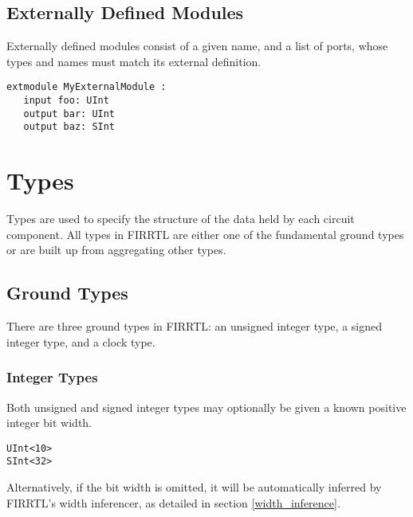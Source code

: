 \documentclass[12pt]{article}
\begin{document}
\subsection{Externally Defined Modules}
Externally defined modules consist of a given name, and a list of ports, whose types and names must match its external definition.

\begin{lstlisting}
extmodule MyExternalModule :
   input foo: UInt
   output bar: UInt
   output baz: SInt
\end{lstlisting}  




\section{Types}

Types are used to specify the structure of the data held by each circuit component. All types in FIRRTL are either one of the fundamental ground types or are built up from aggregating other types. 

\subsection{Ground Types}

There are three ground types in FIRRTL: an unsigned integer type, a signed integer type, and a clock type.

\subsubsection{Integer Types}

Both unsigned and signed integer types may optionally be given a known positive integer bit width.

\begin{lstlisting}
UInt<10>
SInt<32>
\end{lstlisting}  

Alternatively, if the bit width is omitted, it will be automatically inferred by FIRRTL's width inferencer, as detailed in section \ref{width_inference}.
\end{document}
